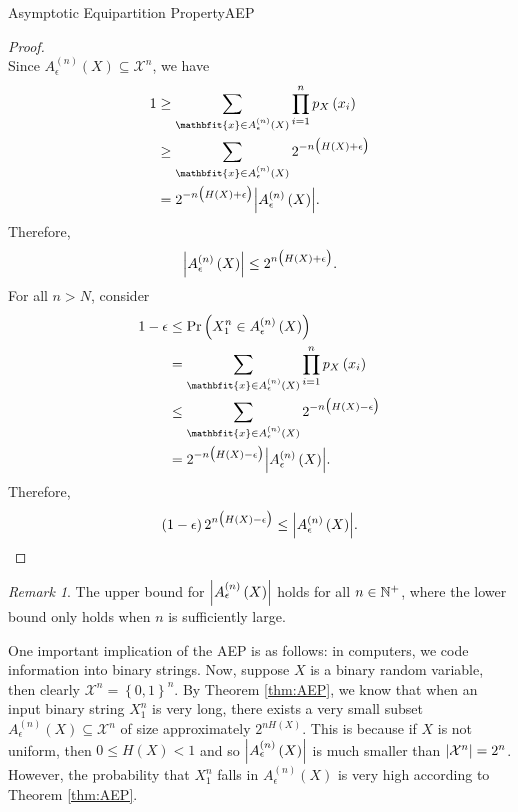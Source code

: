 \documentclass[math]{amznotes}
\theoremstyle{remark}
\newtheorem*{remark}{Remark}
\begin{document}
\begin{thmbox}{Asymptotic Equipartition Property}{AEP}
\begin{proof}
\begin{equation*}
        \end{equation*}
        Since $A_{\epsilon}^{\left(n\right)}\left(X\right) \subseteq \mathcal{X}^n$, we have 
        \begin{align*}
            1 & \geq \sum_{\mathbfit{x} \in A_{\epsilon}^{\left(n\right)}\left(X\right)}\prod_{i = 1}^{n}p_X\left(x_i\right) \\
            & \geq \sum_{\mathbfit{x} \in A_{\epsilon}^{\left(n\right)}\left(X\right)}2^{-n\bigl(H\left(X\right) + \epsilon\bigr)} \\
            & = 2^{-n\bigl(H\left(X\right) + \epsilon\bigr)}\abs{A_{\epsilon}^{\left(n\right)}\left(X\right)}.
        \end{align*}
        Therefore, 
        \begin{equation*}
            {\left\lvert {A_{\epsilon}^{\left(n\right)}\left(X\right)} \right\rvert} \leq 2^{n\bigl(H\left(X\right) + \epsilon\bigr)}.
        \end{equation*}
        For all $n > N$, consider 
        \begin{align*}
            1 - \epsilon & \leq \Pr\left(X_1^n \in A_{\epsilon}^{\left(n\right)}\left(X\right)\right) \\
            & = \sum_{\mathbfit{x} \in A_{\epsilon}^{\left(n\right)}\left(X\right)}\prod_{i = 1}^{n}p_X\left(x_i\right) \\
            & \leq \sum_{\mathbfit{x} \in A_{\epsilon}^{\left(n\right)}\left(X\right)}2^{-n\bigl(H\left(X\right) - \epsilon\bigr)} \\
            & = 2^{-n\bigl(H\left(X\right) - \epsilon\bigr)}\abs{A_{\epsilon}^{\left(n\right)}\left(X\right)}.
        \end{align*}
        Therefore, 
        \begin{equation*}
            \left(1 - \epsilon\right)2^{n\bigl(H\left(X\right) - \epsilon\bigr)} \leq {\left\lvert {A_{\epsilon}^{\left(n\right)}\left(X\right)} \right\rvert}.
        \end{equation*}
    \end{proof}
\end{thmbox}
\begin{notebox}
    \begin{remark}
        The upper bound for ${\left\lvert {A_{\epsilon}^{\left(n\right)}\left(X\right)} \right\rvert}$ holds for all $n \in \mathbb{N}^+$, where the lower bound only holds when $n$ is sufficiently large.
    \end{remark}
\end{notebox}
One important implication of the AEP is as follows: in computers, we code information into binary strings. Now, suppose $X$ is a binary random variable, then clearly $\mathcal{X}^n = \left\{0, 1\right\}^n$. By Theorem \ref{thm:AEP}, we know that when an input binary string $X_1^n$ is very long, there exists a very small subset $A_{\epsilon}^{\left(n\right)}\left(X\right) \subseteq \mathcal{X}^n$ of size approximately $2^{nH\left(X\right)}$. This is because if $X$ is not uniform, then $0 \leq H\left(X\right) < 1$ and so ${\left\lvert {A_{\epsilon}^{\left(n\right)}\left(X\right)} \right\rvert}$ is much smaller than ${\left\lvert {\mathcal{X}^n} \right\rvert} = 2^n$. However, the probability that $X_1^n$ falls in $A_{\epsilon}^{\left(n\right)}\left(X\right)$ is very high according to Theorem \ref{thm:AEP}.
\end{document}
